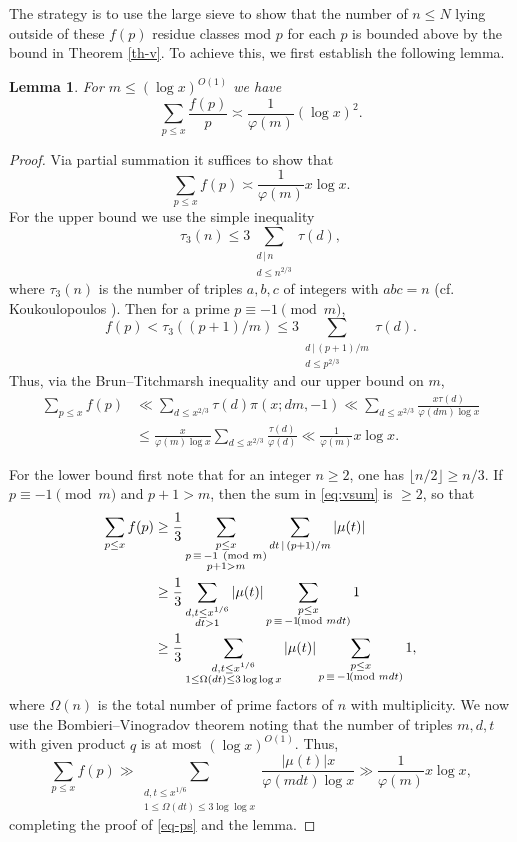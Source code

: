 \documentclass[12pt]{amsart}
\newtheorem{lemma}[theorem]{Lemma}
\theoremstyle{definition}
\theoremstyle{remark}
\numberwithin{equation}{section}
\begin{document}
The strategy is to use the large sieve to
show that the number of $n\le N$ lying outside of these $f(p)$ residue classes
mod $p$ for each $p$ is bounded above by the bound in Theorem \ref{th-v}.
To achieve this, we first establish the following lemma.

\begin{lemma}
\label{lem-sum}
For $m\le(\log x)^{O(1)}$ we have
\[
\sum_{p\le x}\frac{f(p)}{p}\asymp \frac1{\varphi(m)}(\log x)^2.
\]
\end{lemma}
\begin{proof}
Via partial summation it suffices to show that
\begin{equation}
\label{eq-ps}
\sum_{p\le x}f(p)\asymp \frac1{\varphi(m)}x\log x.
\end{equation}
For the upper bound we use the simple inequality
\[
\tau_3(n)\le3\sum_{\substack{d\,|\,n\\d\le n^{2/3}}}\tau(d),
\]
where $\tau_3(n)$ is the number of triples $a,b,c$ of integers with $abc=n$
(cf. Koukoulopoulos \cite[Ex. 20.2]{K}).  Then for a prime $p\equiv-1\pmod m$,
\[
f(p)< \tau_3((p+1)/m)\le 3\sum_{\substack{d\,|\,(p+1)/m\\d\le p^{2/3}}}\tau(d).
\]
Thus, via the Brun--Titchmarsh inequality and our upper  bound on $m$,
\begin{align*}
\sum_{p\le x}f(p)&\ll\sum_{d\le x^{2/3}}\tau(d)\pi(x;dm,-1)\ll\sum_{d\le x^{2/3}}\frac {x\tau(d)}{\varphi(dm)\log x}\\
&\le\frac x{\varphi(m)\log x}\sum_{d\le x^{2/3}}\frac{\tau(d)}{\varphi(d)}\ll \frac1{\varphi(m)}x\log x.
\end{align*}


For the lower bound first note that for an integer $n\ge2$, one has $\lfloor n/2\rfloor\ge n/3$.
If $p\equiv-1\pmod m$ and $p+1>m$, then the sum in
\eqref{eq:vsum} is $\ge2$, so that
\begin{align*}
\sum_{p\le x}f(p)&\ge\frac13\sum_{\substack{p\le x\\p\,\equiv\,-1\pmod m\\p+1>m}}\sum_{dt\,|\,(p+1)/m}|\mu(t)|\\
&\ge
\frac13\sum_{\substack{d,t\le x^{1/6}\\dt>1}}|\mu(t)|\sum_{\substack{p\le x\\p\,\equiv\,-1\kern-5pt\pmod{mdt}}}1\\
&\ge \frac13\sum_{\substack{d,t\le x^{1/6}\\1\le\Omega(dt)\le3\log\log x}}|\mu(t)|\sum_{\substack{p\le x\\p\,\equiv\,-1\kern-5pt\pmod{mdt}}}1,
\end{align*}
where $\Omega(n)$ is the total number of prime factors of $n$ with multiplicity.
We now use the Bombieri--Vinogradov theorem noting that the number of triples $m,d,t$
with given product $q$ is at most $(\log x)^{O(1)}$.  Thus, 
\[
\sum_{p\le x}f(p)\gg
\sum_{\substack{d,t\le x^{1/6}\\1\le \Omega(dt)\le3\log\log x}}\frac{|\mu(t)|x}{\varphi(mdt)\log x}
\gg \frac1{\varphi(m)}x\log x,
\]
completing the proof of \eqref{eq-ps} and the lemma.
\end{proof}
\end{document}
